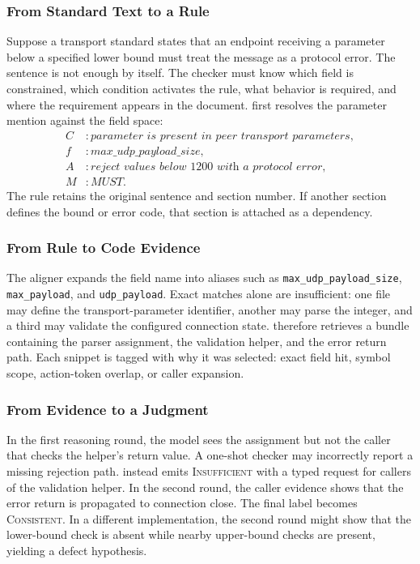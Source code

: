 \subsubsection{From Standard Text to a Rule}

Suppose a transport standard states that an endpoint receiving a parameter
below a specified lower bound must treat the message as a protocol error. The
sentence is not enough by itself. The checker must know which field is
constrained, which condition activates the rule, what behavior is required, and
where the requirement appears in the document. \tool{} first resolves the
parameter mention against the field space:
\[
\begin{aligned}
C &: \textit{parameter is present in peer transport parameters},\\
f &: \textit{max\_udp\_payload\_size},\\
A &: \textit{reject values below 1200 with a protocol error},\\
M &: \textit{MUST}.
\end{aligned}
\]
The rule retains the original sentence and section number. If another section
defines the bound or error code, that section is attached as a dependency.

\subsubsection{From Rule to Code Evidence}

The aligner expands the field name into aliases such as
\texttt{max\_udp\_payload\_size}, \texttt{max\_payload}, and
\texttt{udp\_payload}. Exact matches alone are insufficient: one file may define
the transport-parameter identifier, another may parse the integer, and a third
may validate the configured connection state. \tool{} therefore retrieves a
bundle containing the parser assignment, the validation helper, and the error
return path. Each snippet is tagged with why it was selected: exact field hit,
symbol scope, action-token overlap, or caller expansion.

\subsubsection{From Evidence to a Judgment}

In the first reasoning round, the model sees the assignment but not the caller
that checks the helper's return value. A one-shot checker may incorrectly report
a missing rejection path. \tool{} instead emits \textsc{Insufficient} with a
typed request for callers of the validation helper. In the second round, the
caller evidence shows that the error return is propagated to connection close.
The final label becomes \textsc{Consistent}. In a different implementation, the
second round might show that the lower-bound check is absent while nearby
upper-bound checks are present, yielding a defect hypothesis.

